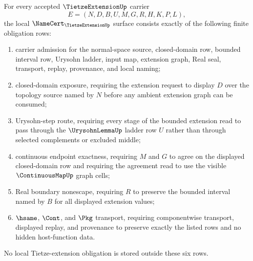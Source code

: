\begin{theorem}
\label{thm:tietze-extension-namecert-obligations}
For every accepted $\TietzeExtensionUp$ carrier
$$
E=(N,D,B,U,M,G,R,H,K,P,L),
$$
the local $\NameCert_{\TietzeExtensionUp}$ surface consists exactly of the following finite obligation rows:
\begin{enumerate}
\item carrier admission for the normal-space source, closed-domain row, bounded interval row, Urysohn ladder, input map, extension graph, Real seal, transport, replay, provenance, and local naming;
\item closed-domain exposure, requiring the extension request to display $D$ over the topology source named by $N$ before any ambient extension graph can be consumed;
\item Urysohn-step route, requiring every stage of the bounded extension read to pass through the $\UrysohnLemmaUp$ ladder row $U$ rather than through selected complements or excluded middle;
\item continuous endpoint exactness, requiring $M$ and $G$ to agree on the displayed closed-domain row and requiring the agreement read to use the visible $\ContinuousMapUp$ graph cells;
\item Real boundary nonescape, requiring $R$ to preserve the bounded interval named by $B$ for all displayed extension values;
\item $\hsame$, $\Cont$, and $\Pkg$ transport, requiring componentwise transport, displayed replay, and provenance to preserve exactly the listed rows and no hidden host-function data.
\end{enumerate}
No local Tietze-extension obligation is stored outside these six rows.
\end{theorem}
